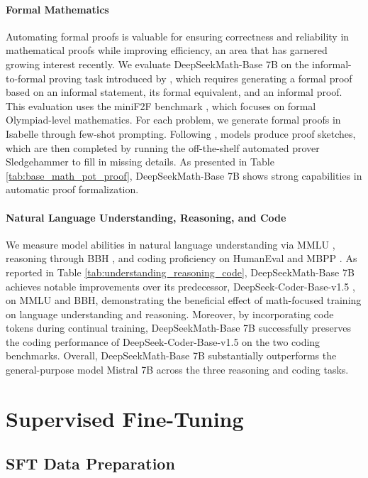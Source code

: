 \paragraph{Formal Mathematics}

Automating formal proofs is valuable for ensuring correctness and reliability in mathematical proofs while improving efficiency, an area that has garnered growing interest recently. We evaluate DeepSeekMath-Base 7B on the informal-to-formal proving task introduced by \citep{dsp_proof}, which requires generating a formal proof based on an informal statement, its formal equivalent, and an informal proof. This evaluation uses the miniF2F benchmark \citep{minif2f}, which focuses on formal Olympiad-level mathematics. For each problem, we generate formal proofs in Isabelle through few-shot prompting. Following \citep{dsp_proof}, models produce proof sketches, which are then completed by running the off-the-shelf automated prover Sledgehammer \citep{sledgehammer} to fill in missing details. As presented in Table \ref{tab:base_math_pot_proof}, DeepSeekMath-Base 7B shows strong capabilities in automatic proof formalization.

\paragraph{Natural Language Understanding, Reasoning, and Code}

We measure model abilities in natural language understanding via MMLU \citep{mmlu}, reasoning through BBH \citep{bbh}, and coding proficiency on HumanEval \citep{codex} and MBPP \citep{mbpp}. As reported in Table \ref{tab:understanding_reasoning_code}, DeepSeekMath-Base 7B achieves notable improvements over its predecessor, DeepSeek-Coder-Base-v1.5 \citep{deepseek-coder}, on MMLU and BBH, demonstrating the beneficial effect of math-focused training on language understanding and reasoning. Moreover, by incorporating code tokens during continual training, DeepSeekMath-Base 7B successfully preserves the coding performance of DeepSeek-Coder-Base-v1.5 on the two coding benchmarks. Overall, DeepSeekMath-Base 7B substantially outperforms the general-purpose model Mistral 7B \citep{mistral} across the three reasoning and coding tasks.

\section{Supervised Fine-Tuning}

\subsection{SFT Data Preparation}

